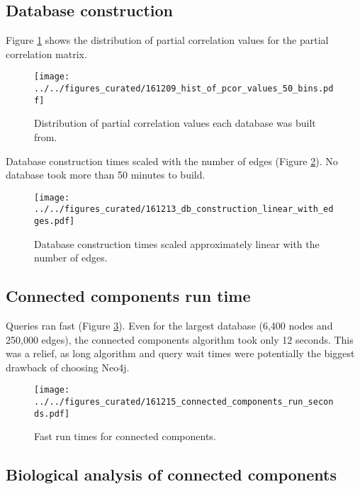 \documentclass[12pt]{article}
\begin{document}
\subsection{Database construction}

Figure \ref{fig:pcor_hist}  shows the distribution of partial correlation values for the partial correlation matrix.  

\begin{figure}[H]
    \captionsetup{width=0.6\textwidth}
    \centering
    \texttt{[image: ../../figures\_curated/161209\_hist\_of\_pcor\_values\_50\_bins.pdf]}
    \caption{Distribution of partial correlation values each database was built from.}
    \label{fig:pcor_hist}
\end{figure}

Database construction times scaled with the number of edges (Figure \ref{fig:build_times}).  
No database took more than 50 minutes to build.

\begin{figure}[H]
    \captionsetup{width=0.6\textwidth}
    \centering
    \texttt{[image: ../../figures\_curated/161213\_db\_construction\_linear\_with\_edges.pdf]}
    \caption{Database construction times scaled approximately linear with the number of edges.}
    \label{fig:build_times}
\end{figure}

\subsection{Connected components run time}

Queries ran fast (Figure \ref{fig:cc_times}). 
Even for the largest database (6,400 nodes and 250,000 edges), the connected components algorithm took only 12 seconds. 
This was a relief, as long algorithm and query wait times were potentially the biggest drawback of choosing Neo4j.

\begin{figure}[H]
    \captionsetup{width=0.6\textwidth}
    \centering
    \texttt{[image: ../../figures\_curated/161215\_connected\_components\_run\_seconds.pdf]}
    \caption{Fast run times for connected components.}
    \label{fig:cc_times}
\end{figure}


\subsection{Biological analysis of connected components}
\end{document}
